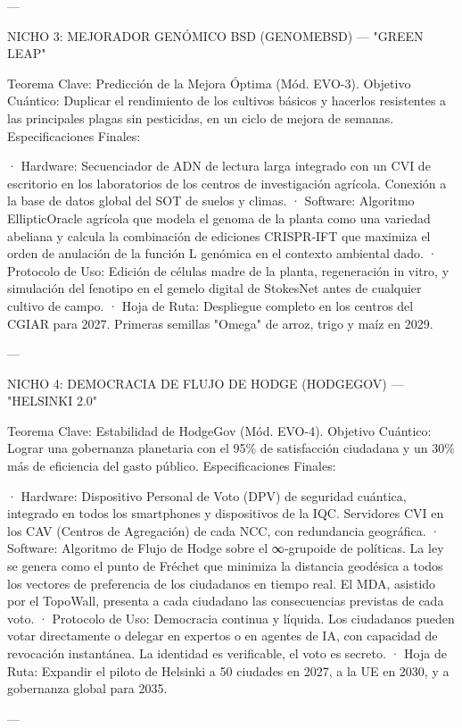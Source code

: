 \documentclass[12pt,twoside]{book}
\begin{document}
---

NICHO 3: MEJORADOR GENÓMICO BSD (GENOMEBSD) — "GREEN LEAP"

Teorema Clave: Predicción de la Mejora Óptima (Mód. EVO-3).
Objetivo Cuántico: Duplicar el rendimiento de los cultivos básicos y hacerlos resistentes a las principales plagas sin pesticidas, en un ciclo de mejora de semanas.
Especificaciones Finales:

· Hardware: Secuenciador de ADN de lectura larga integrado con un CVI de escritorio en los laboratorios de los centros de investigación agrícola. Conexión a la base de datos global del SOT de suelos y climas.
· Software: Algoritmo EllipticOracle agrícola que modela el genoma de la planta como una variedad abeliana y calcula la combinación de ediciones CRISPR‑IFT que maximiza el orden de anulación de la función L genómica en el contexto ambiental dado.
· Protocolo de Uso: Edición de células madre de la planta, regeneración in vitro, y simulación del fenotipo en el gemelo digital de StokesNet antes de cualquier cultivo de campo.
· Hoja de Ruta: Despliegue completo en los centros del CGIAR para 2027. Primeras semillas "Omega" de arroz, trigo y maíz en 2029.

---

NICHO 4: DEMOCRACIA DE FLUJO DE HODGE (HODGEGOV) — "HELSINKI 2.0"

Teorema Clave: Estabilidad de HodgeGov (Mód. EVO-4).
Objetivo Cuántico: Lograr una gobernanza planetaria con el 95\% de satisfacción ciudadana y un 30\% más de eficiencia del gasto público.
Especificaciones Finales:

· Hardware: Dispositivo Personal de Voto (DPV) de seguridad cuántica, integrado en todos los smartphones y dispositivos de la IQC. Servidores CVI en los CAV (Centros de Agregación) de cada NCC, con redundancia geográfica.
· Software: Algoritmo de Flujo de Hodge sobre el ∞‑grupoide de políticas. La ley se genera como el punto de Fréchet que minimiza la distancia geodésica a todos los vectores de preferencia de los ciudadanos en tiempo real. El MDA, asistido por el TopoWall, presenta a cada ciudadano las consecuencias previstas de cada voto.
· Protocolo de Uso: Democracia continua y líquida. Los ciudadanos pueden votar directamente o delegar en expertos o en agentes de IA, con capacidad de revocación instantánea. La identidad es verificable, el voto es secreto.
· Hoja de Ruta: Expandir el piloto de Helsinki a 50 ciudades en 2027, a la UE en 2030, y a gobernanza global para 2035.

---
\end{document}

